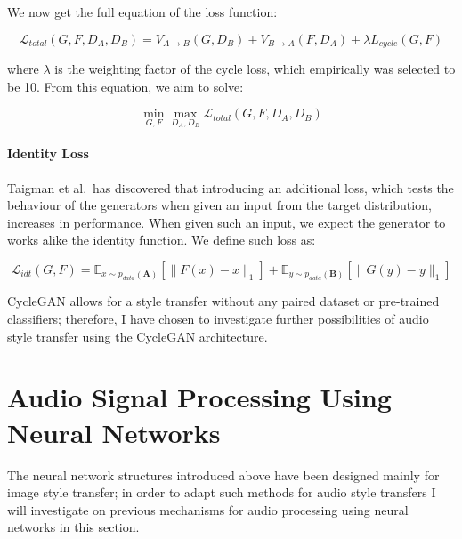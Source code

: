 \documentclass[12pt,a4paper,]{report}
\begin{document}
We now get the full equation of the loss function:

\begin{equation}
    \mathcal{L}_{total}(G, F, D_A, D_B) = V_{A \rightarrow B}(G, D_B) + V_{B \rightarrow A}(F, D_A) + \lambda L_{cycle}(G, F) \label{eq:cyclegan_total}
\end{equation}

where \(\lambda\) is the weighting factor of the cycle loss, which
empirically was selected to be 10. From this equation, we aim to solve:

\begin{equation}
    \min_{G, F} \max_{D_A, D_B} \mathcal{L}_{total}(G, F, D_A, D_B)
\end{equation}

\paragraph{Identity Loss \label{identity-loss}}

Taigman et al.~has discovered that introducing an additional loss, which
tests the behaviour of the generators when given an input from the
target distribution, increases in performance. When given such an input,
we expect the generator to works alike the identity function. We define
such loss as:

\begin{equation}
    \mathcal{L}_{idt}(G, F) = \mathbb{E}_{x \sim p_{data}(\mathbf{A})}[\|F(x) - x\|_1] + \mathbb{E}_{y \sim p_{data}(\mathbf{B})}[\|G(y) - y\|_1]
\end{equation}

CycleGAN allows for a style transfer without any paired dataset or
pre-trained classifiers; therefore, I have chosen to investigate further
possibilities of audio style transfer using the CycleGAN architecture.

\hypertarget{audio-signal-processing-using-neural-networks}{%
\section{Audio Signal Processing Using Neural
Networks}\label{audio-signal-processing-using-neural-networks}}

The neural network structures introduced above have been designed mainly
for image style transfer; in order to adapt such methods for audio style
transfers I will investigate on previous mechanisms for audio processing
using neural networks in this section.
\end{document}
